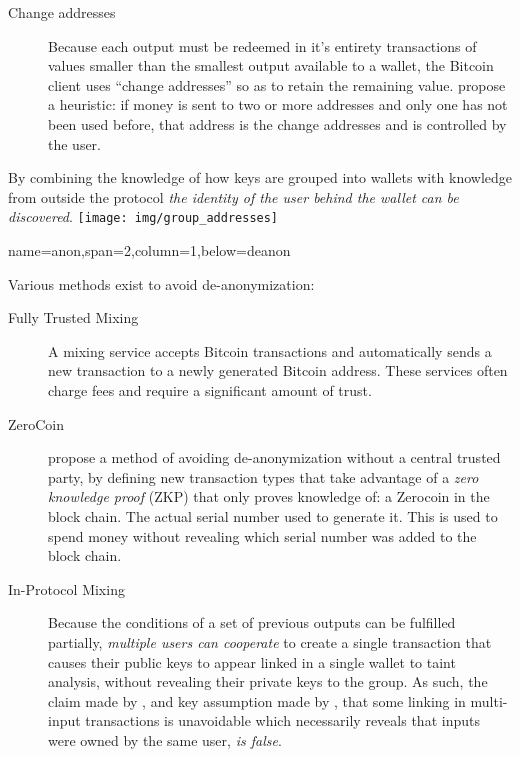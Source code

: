 \documentclass[a0paper,portrait]{baposter}
\begin{document}
\begin{poster}
{\begin{multicols}{2}
\begin{description}
\item[Change addresses]
Because each output must be redeemed in it's entirety transactions of values smaller than the smallest output available to a wallet, the Bitcoin client uses ``change addresses'' so as to retain the remaining value.\textcite{eval-priv} propose a heuristic: if money is sent to two or more addresses and only one has not been used before, that address is the change addresses and is controlled by the user.
\end{description}
By combining the knowledge of how keys are grouped into wallets with knowledge from outside the protocol \emph{the identity of the user behind the wallet can be discovered}\cite{reid-anon}.
\texttt{[image: img/group\_addresses]}
\end{multicols}
}

{name=anon,span=2,column=1,below=deanon}{
\begin{multicols}{2}
Various methods exist to avoid de-anonymization:
\begin{description}
\item[Fully Trusted Mixing]
A mixing service accepts Bitcoin transactions and automatically sends a new transaction to a newly generated Bitcoin address.  These services often charge fees and require a significant amount of trust.
\item[ZeroCoin]
\textcite{zerocoin} propose a method of avoiding de-anonymization without a central trusted party, by defining new transaction types that take advantage of a \emph{zero knowledge proof} (ZKP) that only proves knowledge of: a Zerocoin in the block chain. The actual serial number used to generate it. This is used to spend money without revealing which serial number was added to the block chain.
\item[In-Protocol Mixing]
Because the conditions of a set of previous outputs can be fulfilled partially, \emph{multiple users can cooperate} to create a single transaction that causes their public keys to appear linked in a single wallet to taint analysis, without revealing their private keys to the group.  As such, the claim made by \textcite{satoshi}, and key assumption made by \textcite{reid-anon}, that some linking in multi-input transactions is unavoidable which necessarily reveals that inputs were owned by the same user, \emph{is false}.

\end{description}
\end{multicols}
}


\end{poster}
\end{document}
